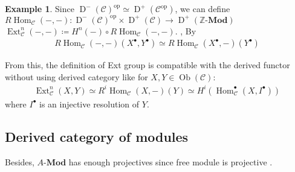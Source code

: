 \documentclass[a4paper,dvipdfmx,reqno,12pt]{amsart}
\theoremstyle{definition}
\newtheorem{Eg}[Thm]{Example}
\newcommand{\deq}{\coloneqq}
\newcommand{\Z}{\mathbb{Z}}%
\newcommand{\mcal}[1]{\mathcal{#1}}%
\newcommand{\opn}[1]{\operatorname{#1}}
\newcommand{\catn}[1]{\mathbf{#1}}
\numberwithin{equation}{section}
\begin{document}
\begin{Eg}
  Since $\opn{D}^{-}(\mcal{C})^{\opn{op}}\simeq \opn{D}^{+}(\mcal{C}^{\opn{op}})$, we can define
  $R\opn{Hom}_{\mcal{C}}(-,-): \opn{D}^{-}(\mcal{C})^{\opn{op}}\times \opn{D}^{+}(\mcal{C})\to \opn{D}^{+}(\Z\text{-}\catn{Mod})$
  $\opn{Ext}_{\mcal{C}}^{n}(-,-)\deq H^{n}(-)\circ R\opn{Hom}_{\mcal{C}}(-,-)$.
  ,
  By \cite[Corollary 1.10.5]{MR1299726}
  \begin{align}
    R\opn{Hom}_{\mcal{C}}(-,-)(X^{\bullet},Y^{\bullet})\simeq R\opn{Hom}_{\mcal{C}}(X^{\bullet},-)(Y^{\bullet})
  \end{align}

  From this, the definition of Ext group is compatible with the derived functor without using derived category like \cite[III.1]{hartshorneAlgebraicGeometry1977a} for $X,Y\in \opn{Ob}(\mcal{C})$:
  \begin{align}
    \opn{Ext}^{n}_{\mcal{C}}(X,Y)\simeq R^{i}\opn{Hom}_{\mcal{C}}(X,-)(Y)\simeq H^{i}(\opn{Hom}_{\mcal{C}}^{\bullet}(X,I^{\bullet}))
  \end{align}
  where $I^{\bullet}$ is an injective resolution of $Y$.
\end{Eg}





\subsection{Derived category of modules}

Besides, $A\text{-}\catn{Mod}$ has enough projectives since free module is projective \cite[Proposition 2.2.1]{MR1269324}.
\end{document}
